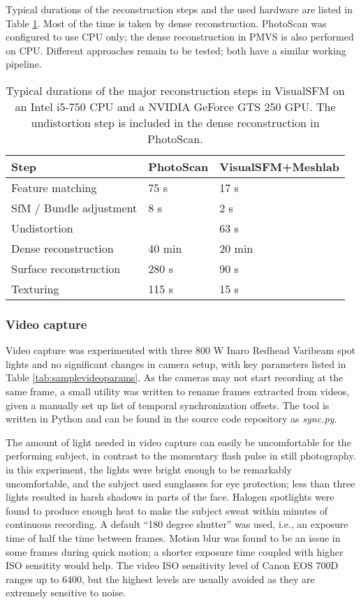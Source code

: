 Typical durations of the reconstruction steps and the used hardware are listed in Table \ref{tab:reconsttime}.
Most of the time is taken by dense reconstruction.
PhotoScan was configured to use CPU only; the dense reconstruction in PMVS is also performed on CPU.
Different approaches remain to be tested; both have a similar working pipeline.

\begin{table}[t]
	\centering
	\begin{tabular}{l l l}
		Step & PhotoScan & VisualSFM+Meshlab \\ \hline
		Feature matching & 75 s & 17 s \\
		SfM / Bundle adjustment & 8 s & 2 s\\
		Undistortion & & 63 s\\
		Dense reconstruction & 40 min & 20 min\\
		Surface reconstruction & 280 s & 90 s\\
		Texturing & 115 s & 15 s\\
	\end{tabular}
	\caption{
		Typical durations of the major reconstruction steps in VisualSFM on an Intel i5-750 CPU and a NVIDIA GeForce GTS 250 GPU.
		The undistortion step is included in the dense reconstruction in PhotoScan.
	}
	\label{tab:reconsttime}
\end{table}

\afterpage{\clearpage}
\subsubsection{Video capture}


Video capture was experimented with three 800 W Inaro Redhead Varibeam spot lights and no significant changes in camera setup, with key parameters listed in Table \ref{tab:samplevideoparams}.
As the cameras may not start recording at the same frame, a small utility was written to rename frames extracted from videos, given a manually set up list of temporal synchronization offsets.
The tool is written in Python and can be found in the source code repository as \emph{sync.py}.

The amount of light needed in video capture can easily be uncomfortable for the performing subject, in contrast to the momentary flash pulse in still photography.
in this experiment, the lights were bright enough to be remarkably uncomfortable, and the subject used sunglasses for eye protection; less than three lights resulted in harsh shadows in parts of the face.
Halogen spotlights were found to produce enough heat to make the subject sweat within minutes of continuous recording.
A default ``180 degree shutter'' was used, i.e., an exposure time of half the time between frames.
Motion blur was found to be an issue in some frames during quick motion; a shorter exposure time coupled with higher ISO sensitity would help.
The video ISO sensitivity level of Canon EOS 700D ranges up to 6400, but the highest levels are usually avoided as they are extremely sensitive to noise.

